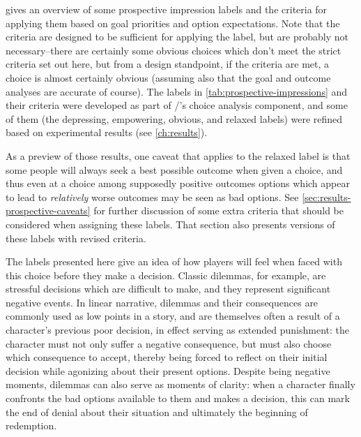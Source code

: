  gives an overview of some prospective impression labels and the criteria for applying them based on goal priorities and option expectations.
%
Note that the criteria are designed to be sufficient for applying the label, but are probably not necessary--there are certainly some obvious choices which don't meet the strict criteria set out here, but from a design standpoint, if the criteria are met, a choice is almost certainly obvious (assuming also that the goal and outcome analyses are accurate of course).
%
The labels in \cref{tab:prospective-impressions} and their criteria were developed as part of \dunyazad/'s choice analysis component, and some of them (the depressing, empowering, obvious, and relaxed labels) were refined based on experimental results (see \cref{ch:results}).


As a preview of those results, one caveat that applies to the relaxed label is that some people will always seek a best possible outcome when given a choice, and thus even at a choice among supposedly positive outcomes options which appear to lead to \emph{relatively} worse outcomes may be seen as bad options.
%
See \cref{sec:results-prospective-caveats} for further discussion of some extra criteria that should be considered when assigning these labels.
%
That section also presents versions of these labels with revised criteria.


The labels presented here give an idea of how players will feel when faced with this choice before they make a decision.
%
Classic dilemmas, for example, are stressful decisions which are difficult to make, and they represent significant negative events.
%
In linear narrative, dilemmas and their consequences are commonly used as low points in a story, and are themselves often a result of a character's previous poor decision, in effect serving as extended punishment: the character must not only suffer a negative consequence, but must also choose which consequence to accept, thereby being forced to reflect on their initial decision while agonizing about their present options.
%
Despite being negative moments, dilemmas can also serve as moments of clarity: when a character finally confronts the bad options available to them and makes a decision, this can mark the end of denial about their situation and ultimately the beginning of redemption.


